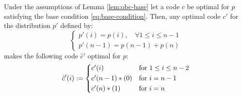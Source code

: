 \documentclass[toc]{../cs-classes/cs-classes}
\begin{document}
\begin{lemma}
    \label{lem:recursive-step}
    Under the assumptions of Lemma \ref{lem:obc-base} let a code $c$ be optimal for $p$ satisfying the base condition \eqref{eq:base-condition}. Then, any optimal code $c'$ for the distribution $p'$ defined by:
    \begin{equation*}
        \begin{cases*}
            p'(i) = p(i), \quad \forall 1\leq i\leq n-1\\
            p'(n-1) = p(n-1) + p(n)
        \end{cases*}
    \end{equation*}
    makes the following code $\hat{c}'$ optimal for $p$:
    \begin{equation*}
        \hat{c}'(i) := 
        \begin{cases*}
            c'(i) & for $1\leq i\leq n-2$\\
            c'(n-1) * (0) & for $i=n-1$\\
            c'(n) * (1) & for $i=n$
        \end{cases*}
    \end{equation*}
\end{lemma}
\end{document}
